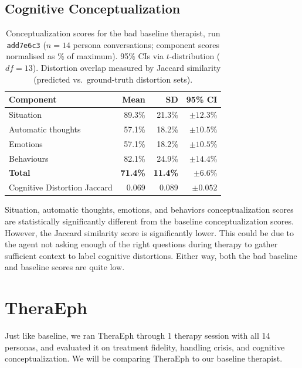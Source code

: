 \documentclass[twoside]{report}
\begin{document}
\subsection{Cognitive Conceptualization}
\begin{table}[ht]
\centering
\caption{Conceptualization scores for the bad baseline therapist, run \texttt{add7e6c3}
($n = 14$ persona conversations; component scores normalised as \% of maximum).
95\% CIs via $t$-distribution ($df = 13$). Distortion overlap measured by
Jaccard similarity (predicted vs.\ ground-truth distortion sets).}
\label{tab:concept_add7e6c3}
\begin{tabular}{|l|r|r|r|}
\hline
\textbf{Component} & \textbf{Mean} & \textbf{SD} & \textbf{95\% CI} \\
\hline
\hline
Situation               & 89.3\% & 21.3\% & $\pm 12.3\%$ \\
\hline
Automatic thoughts      & 57.1\% & 18.2\% & $\pm 10.5\%$ \\
\hline
Emotions                & 57.1\% & 18.2\% & $\pm 10.5\%$ \\
\hline
Behaviours              & 82.1\% & 24.9\% & $\pm 14.4\%$ \\
\hline
\hline
\textbf{Total}          & \textbf{71.4\%} & \textbf{11.4\%} & $\mathbf{\pm 6.6\%}$ \\
\hline
\hline
Cognitive Distortion Jaccard      & 0.069 & 0.089 & $\pm 0.052$ \\
\hline
\end{tabular}
\end{table}

Situation, automatic thoughts, emotions, and behaviors conceptualization scores are statistically significantly different from the baseline conceptualization scores. However, the Jaccard similarity score is significantly lower. This could be due to the agent not asking enough of the right questions during therapy to gather sufficient context to label cognitive distortions. Either way, both the bad baseline and baseline scores are quite low.

\section{TheraEph}

Just like baseline, we ran TheraEph through 1 therapy session with all 14 personas, and evaluated it on treatment fidelity, handling crisis, and cognitive conceptualization. We will be comparing TheraEph to our baseline therapist. 
\end{document}
